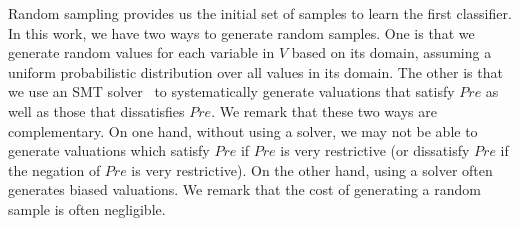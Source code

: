 %

Random sampling provides us the initial set of samples to learn the first classifier. In this work, we have two ways to generate random samples. One is that we generate random values for each variable in $V$ based on its domain, assuming a uniform probabilistic distribution over all values in its domain. The other is that we use an SMT solver~\cite{barrett2009satisfiability,de2008z3} to systematically generate valuations that satisfy $\mathit{Pre}$ as well as those that dissatisfies $\mathit{Pre}$. We remark that these two ways are complementary. On one hand, without using a solver, we may not be able to generate valuations which satisfy $\mathit{Pre}$ if $\mathit{Pre}$ is very restrictive (or dissatisfy $\mathit{Pre}$ if the negation of $\mathit{Pre}$ is very restrictive). On the other hand, using a solver often generates biased valuations. We remark that the cost of generating a random sample is often negligible.

